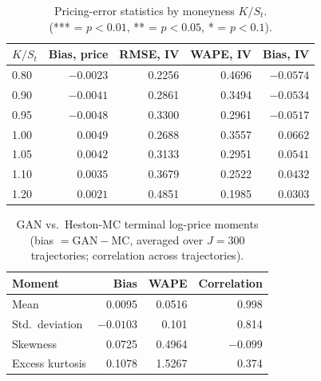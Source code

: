 \begin{table}[H]
\centering
\caption{Pricing-error statistics by moneyness $K/S_t$. \\(*** = $p<0.01$, ** = $p<0.05$, * = $p<0.1$).}
\label{tab:moneyness}
\begin{tabular}{lrrrr}
\toprule
$K/S_t$ & Bias, price & RMSE, IV & WAPE, IV & Bias, IV \\
\midrule
0.80 & $-0.0023$\text{***} & 0.2256 & 0.4696 & $-0.0574$\text{***}\\
0.90 & $-0.0041$\text{***} & 0.2861 & 0.3494 & $-0.0534$\text{**} \\
0.95 & $-0.0048$\text{**} & 0.3300 & 0.2961 & $-0.0517$\text{**} \\
1.00 & $\phantom{-}0.0049$\text{*} & 0.2688 & 0.3557 & $\phantom{-}0.0662$\text{*} \\
1.05 & $\phantom{-}0.0042$\text{**} & 0.3133 & 0.2951 & $\phantom{-}0.0541$\text{*} \\
1.10 & $\phantom{-}0.0035$\text{**} & 0.3679 & 0.2522 & $\phantom{-}0.0432$\text{**} \\
1.20 & $\phantom{-}0.0021$\text{***} & 0.4851 & 0.1985 & $\phantom{-}0.0303$\text{***} \\
\bottomrule
\end{tabular}
\end{table}

\begin{table}[H]
\centering
\caption{GAN vs.\ Heston-MC terminal log-price moments (bias
$=\text{GAN}-\text{MC}$, averaged over $J=300$ trajectories; correlation
across trajectories).}
\label{tab:moments}
\begin{tabular}{lrrr}
\toprule
Moment & Bias & WAPE & Correlation \\
\midrule
Mean               & 0.0095  & 0.0516 & 0.998 \\
Std.\ deviation     & $-0.0103$ & 0.101 & 0.814 \\
Skewness            & 0.0725  & 0.4964 & $-0.099$ \\
Excess kurtosis     & 0.1078  & 1.5267 & 0.374 \\
\bottomrule
\end{tabular}
\end{table}

